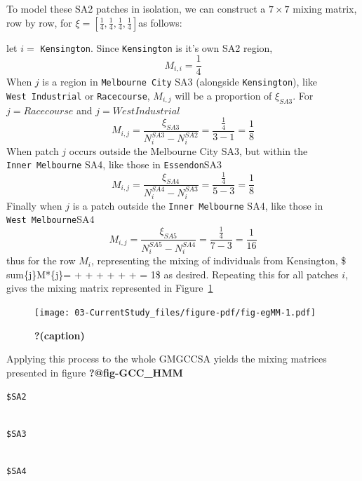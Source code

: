 \documentclass[
  letterpaper,
  DIV=11,
  numbers=noendperiod]{scrreprt}
\begin{document}
To model these SA2 patches in isolation, we can construct a
\(7 \times 7\) mixing matrix, row by row, for
\(\xi = \left[ \frac{1}{4}, \frac{1}{4},\frac{1}{4},\frac{1}{4} \right]\)as
follows:

let \(i =\) \texttt{Kensington}. Since \texttt{Kensington} is it's own
SA2 region, \[M_{i,i} = \frac{1}{4}\]When \(j\) is a region in
\texttt{Melbourne\ City} SA3 (alongside \texttt{Kensington}), like
\texttt{West\ Industrial} or \texttt{Racecourse}, \(M_{i,j}\) will be a
proportion of \(\xi_{SA3}\). For \(j = Racecourse\) and
\(j = West Industrial\) \[
M_{i,j} = \frac{\xi_{SA3}}{N_{i}^{SA3} - N_{i}^{SA2}} = \frac{\frac{1}{4}}{3 - 1} = \frac{1}{8}
\] When patch \(j\) occurs outside the Melbourne City SA3, but within
the \texttt{Inner\ Melbourne} SA4, like those in \texttt{Essendon}SA3 \[
M_{i,j} = \frac{\xi_{SA4}}{N_{i}^{SA4} - N_{i}^{SA3}} = \frac{\frac{1}{4}}{5 - 3} = \frac{1}{8}
\] Finally when \(j\) is a patch outside the \texttt{Inner\ Melbourne}
SA4, like those in \texttt{West\ Melbourne}SA4 \[
M_{i,j} = \frac{\xi_{SA5}}{N_{i}^{SA5} - N_{i}^{SA4}} = \frac{\frac{1}{4}}{7 - 3} = \frac{1}{16}
\] thus for the row \(M_{i}\), representing the mixing of individuals
from Kensington, \$ sum\limits*\{j\}M*\{j\}=  + +
 + +  +  +  = 1\$
as desired. Repeating this for all patches \(i\), gives the mixing
matrix represented in Figure~\ref{fig-egMM}

\begin{figure}

{\centering \texttt{[image: 03-CurrentStudy\_files/figure-pdf/fig-egMM-1.pdf]}

}

\caption{\label{fig-egMM}\textbf{?(caption)}}

\end{figure}

Applying this process to the whole GMGCCSA yields the mixing matrices
presented in figure \textbf{?@fig-GCC\_HMM}

\begin{verbatim}
$SA2
\end{verbatim}

\begin{verbatim}

$SA3
\end{verbatim}

\begin{verbatim}

$SA4
\end{verbatim}
\end{document}
